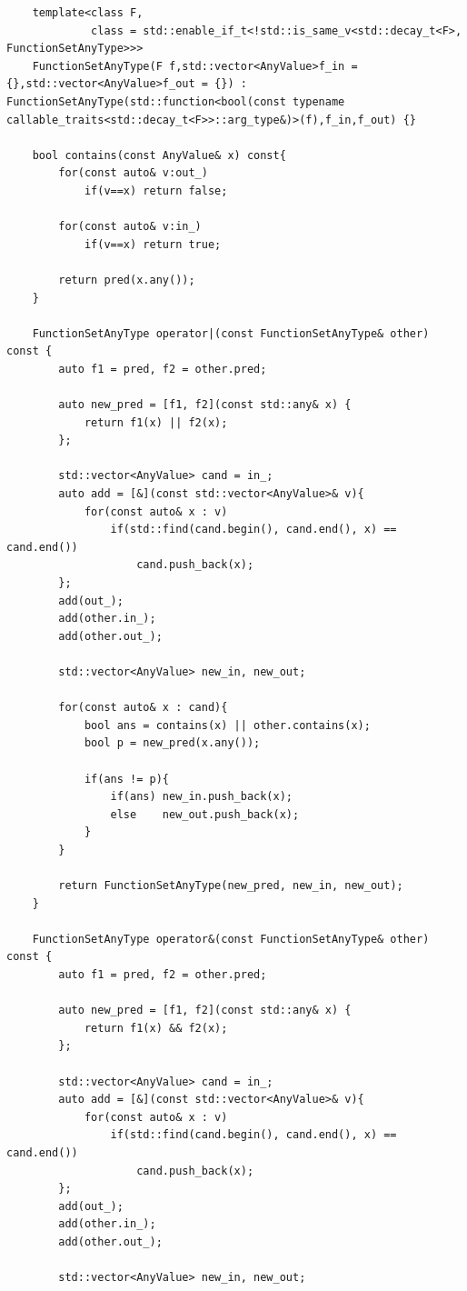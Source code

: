 \documentclass[a4paper,11pt]{ltjsarticle}
\begin{document}
\begin{lstlisting}
    template<class F,
             class = std::enable_if_t<!std::is_same_v<std::decay_t<F>, FunctionSetAnyType>>>
    FunctionSetAnyType(F f,std::vector<AnyValue>f_in = {},std::vector<AnyValue>f_out = {}) : FunctionSetAnyType(std::function<bool(const typename callable_traits<std::decay_t<F>>::arg_type&)>(f),f_in,f_out) {}

    bool contains(const AnyValue& x) const{
        for(const auto& v:out_)
            if(v==x) return false;

        for(const auto& v:in_)
            if(v==x) return true;

        return pred(x.any());
    }

    FunctionSetAnyType operator|(const FunctionSetAnyType& other) const {
        auto f1 = pred, f2 = other.pred;

        auto new_pred = [f1, f2](const std::any& x) {
            return f1(x) || f2(x);
        };

        std::vector<AnyValue> cand = in_;
        auto add = [&](const std::vector<AnyValue>& v){
            for(const auto& x : v)
                if(std::find(cand.begin(), cand.end(), x) == cand.end())
                    cand.push_back(x);
        };
        add(out_);
        add(other.in_);
        add(other.out_);

        std::vector<AnyValue> new_in, new_out;

        for(const auto& x : cand){
            bool ans = contains(x) || other.contains(x);
            bool p = new_pred(x.any());

            if(ans != p){
                if(ans) new_in.push_back(x);
                else    new_out.push_back(x);
            }
        }

        return FunctionSetAnyType(new_pred, new_in, new_out);
    }

    FunctionSetAnyType operator&(const FunctionSetAnyType& other) const {
        auto f1 = pred, f2 = other.pred;

        auto new_pred = [f1, f2](const std::any& x) {
            return f1(x) && f2(x);
        };

        std::vector<AnyValue> cand = in_;
        auto add = [&](const std::vector<AnyValue>& v){
            for(const auto& x : v)
                if(std::find(cand.begin(), cand.end(), x) == cand.end())
                    cand.push_back(x);
        };
        add(out_);
        add(other.in_);
        add(other.out_);

        std::vector<AnyValue> new_in, new_out;


\end{lstlisting}
\end{document}
